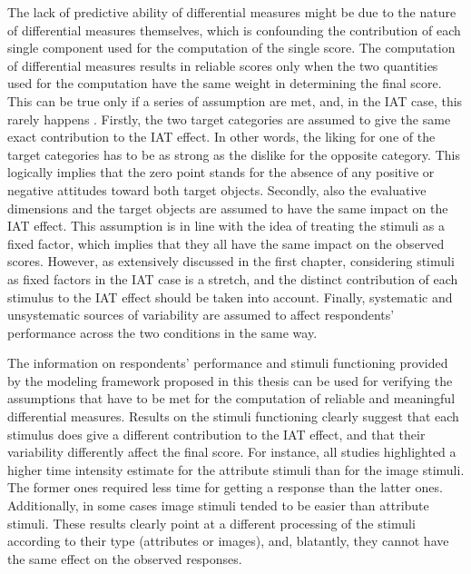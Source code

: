 \documentclass[12pt]{book}
\begin{document}
The lack of predictive ability of differential measures might be due to the nature of differential measures themselves, which is confounding the contribution of each single component used for the computation of the single score. 
The computation of differential measures results in reliable scores only when the two quantities used for the computation have the same weight in determining the final score. This can be true only if a series of assumption are met, and, in the IAT case, this rarely happens \cite{fiedler2006}.
Firstly, the two target categories are assumed to give the same exact contribution to the IAT effect. In other words, the liking for one of the target categories has to be as strong as the dislike for the opposite category. 
This logically implies that the zero point stands for the absence of any positive or negative attitudes toward both target objects. 
Secondly, also the evaluative dimensions and the target objects are assumed to have the same impact on the IAT effect. 
This assumption is in line with the idea of treating the stimuli as a fixed factor, which implies that they all have the same impact on the observed scores. 
However, as extensively discussed in the first chapter, considering stimuli as fixed factors in the IAT case is a stretch, and the distinct contribution of each stimulus to the IAT effect should be taken into account.
Finally, systematic and unsystematic sources of variability are assumed to affect respondents’ performance across the two conditions in the same way.

The information on respondents' performance and stimuli functioning provided by the modeling framework proposed in this thesis can be used for verifying the assumptions that have to be met for the computation of reliable and meaningful differential measures.
Results on the stimuli functioning clearly suggest that each stimulus does give a different contribution to the IAT effect, and that their  variability differently affect the final score. 
For instance, all studies highlighted a higher time intensity estimate for the attribute stimuli than for the image stimuli. 
The former ones required less time for getting a response than the latter ones. Additionally, in some cases image stimuli tended to be easier than attribute stimuli. 
These results clearly point at a different processing of the stimuli according to their type (attributes or images), and, blatantly, they cannot have the same effect on the observed responses.  
\end{document}
